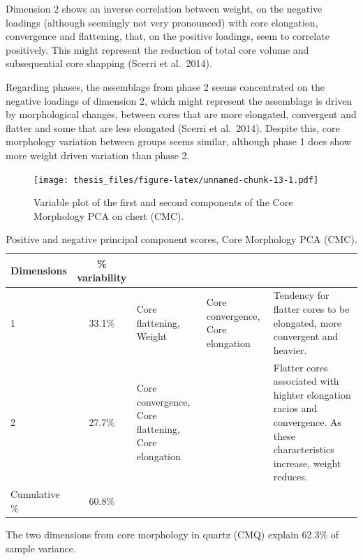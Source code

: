 \documentclass[12pt,twoside]{reedthesis}
\begin{document}
Dimension 2 shows an inverse correlation between weight, on the negative loadings (although seemingly not very pronounced) with core elongation, convergence and flattening, that, on the positive loadings, seem to correlate positively. This might represent the reduction of total core volume and subsequential core shapping (Scerri et al.~2014).

Regarding phases, the assemblage from phase 2 seems concentrated on the negative loadings of dimension 2, which might represent the assemblage is driven by morphological changes, between cores that are more elongated, convergent and flatter and some that are less elongated (Scerri et al.~2014). Despite this, core morphology variation between groups seems similar, although phase 1 does show more weight driven variation than phase 2.
\begin{figure}
\centering
\texttt{[image: thesis\_files/figure-latex/unnamed-chunk-13-1.pdf]}
\caption{\label{fig:unnamed-chunk-13}Variable plot of the first and second components of the Core Morphology PCA on chert (CMC).}
\end{figure}
\begin{table}[!h]

\caption{\label{tab:unnamed-chunk-14}Positive and negative principal component scores, Core Morphology PCA (CMC).}
\centering
\begin{tabular}[t]{lc>{\raggedright\arraybackslash}p{3cm}>{\raggedright\arraybackslash}p{3cm}>{\raggedright\arraybackslash}p{3cm}}
\toprule
\multicolumn{1}{c}{\textbf{Dimensions}} & \multicolumn{1}{c}{\textbf{\% variability}} & \multicolumn{1}{>{\centering\arraybackslash}p{3cm}}{\textbf{+}} & \multicolumn{1}{>{\centering\arraybackslash}p{3cm}}{\textbf{-}} & \multicolumn{1}{>{\centering\arraybackslash}p{3cm}}{\textbf{Interpretation}}\\
\midrule
1 & 33.1\% & Core flattening, Weight & Core convergence, Core elongation & Tendency for flatter cores to be elongated, more convergent and heavier.\\
2 & 27.7\% & Core convergence, Core flattening, Core elongation &  & Flatter cores associated with highter elongation racios and convergence. As these characteristics increase, weight reduces.\\
Cumulative \% & 60.8\% &  &  & \\
\bottomrule
\end{tabular}
\end{table}
The two dimensions from core morphology in quartz (CMQ) explain 62.3\% of sample variance.
\end{document}
